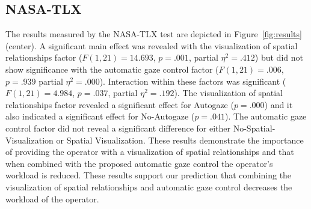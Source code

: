 \documentclass[a4paper, 10pt, conference]{ieeeconf}     %
\begin{document}

\subsection{NASA-TLX}
The results measured by the NASA-TLX test are depicted in Figure~\ref{fig:results} (center).
A significant main effect was revealed with the visualization of spatial relationships factor ($F(1,21)=14.693$, $p=.001$, partial $\eta^2=.412$) but did not show significance with the automatic gaze control factor ($F(1,21)=.006$, $p=.939$ partial $\eta^2=.000$).
Interaction within these factors was significant ($F(1,21)=4.984$, $p=.037$, partial $\eta^2=.192$).
The visualization of spatial relationships factor revealed a significant effect for Autogaze ($p=.000$) and it also indicated a significant effect for No-Autogaze ($p=.041$).
The automatic gaze control factor did not reveal a significant difference for either No-Spatial-Visualization or Spatial Visualization.
These results demonstrate the importance of providing the operator with a visualization of spatial relationships and that when combined with the proposed automatic gaze control the operator's workload is reduced. 
These results support our prediction that combining the visualization of spatial relationships and automatic gaze control decreases the workload of the operator. 
\end{document}
